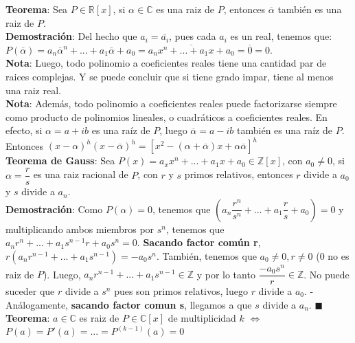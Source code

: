 \documentclass[11pt,a4paper]{article}
\newcommand*{\QEDA}{\null\nobreak\hfill\ensuremath{\blacksquare}}
\begin{document}
\noindent \textbf{Teorema}: Sea $P\in\mathbb{R}[x]$, si $\alpha \in \mathbb{C}$ es una raiz de $P$, entonces $\overline{\alpha}$ tambi\'en es una raiz de $P$.\\ \textbf{Demostraci\'on}: Del hecho que $a_i = \overline{a_i}$, pues cada $a_i$ es un real, tenemos que:\\ $P(\overline{\alpha}) = a_n\overline{\alpha}^n+...+a_1\overline{\alpha} + a_0 = \overline{a_nx^n+...+a_1x+a_0} = \overline{0} = 0$.\\

\noindent \textbf{Nota}: Luego, todo polinomio a coeficientes reales tiene una cantidad par de raices complejas. Y se puede concluir que si tiene grado impar, tiene al menos una raiz real.\\
\noindent \textbf{Nota}: Adem\'as, todo polinomio a coeficientes reales puede factorizarse siempre como producto de polinomios lineales, o cuadr\'aticos a coeficientes reales. En efecto, si $\alpha=a+ib$ es una ra\'iz de $P$, luego $\overline{\alpha}=a-ib$ tambi\'en es una ra\'iz de $P$. Entonces $(x-\alpha)^h(x-\overline{\alpha})^h = [x^2-(\alpha+\overline{\alpha})x+\alpha\overline{\alpha}]^h$\\

\noindent \textbf{Teorema de Gauss}: Sea $P(x)=a_xx^n + ... +a_1x+a_0 \in \mathbb{Z}[x]$, con $a_0\not=0$, si $\alpha=\dfrac{r}{s}$ es una raiz racional de $P$, con $r$ y $s$ primos relativos, entonces $r$ divide a $a_0$ y $s$ divide a $a_n$.\\
\textbf{Demostraci\'on}: Como $P(\alpha) = 0$, tenemos que $\left(a_n\dfrac{r^n}{s^n} + ... + a_1\dfrac{r}{s}+a_0\right) = 0$ y multiplicando ambos miembros por $s^n$, tenemos que $a_nr^n + ... + a_1s^{n-1}r+a_0s^{n} = 0$. \textbf{Sacando factor com\'un r}, $r(a_nr^{n-1} + ... + a_1s^{n-1}) = -a_0s^{n}$. Tambi\'en, tenemos que $a_0\not=0, r\not=0$ (0 no es raiz de $P$). Luego, $a_nr^{n-1} + ... + a_1s^{n-1} \in \mathbb{Z}$ y por lo tanto $\dfrac{-a_0s^n}{r} \in \mathbb{Z}$. No puede suceder que $r$ divide a $s^n$ pues son primos relativos, luego $r$ divide a $a_0$. - An\'alogamente, \textbf{sacando factor comun s}, llegamos a que $s$ divide a $a_n$. \QEDA\\

\noindent \textbf{Teorema}: $a\in\mathbb{C}$ es raiz de $P\in\mathbb{C}[x]$ de multiplicidad $k$ $\iff$ $P(a)=P'(a)=...=P^{(k-1)}(a)=0$
\end{document}
